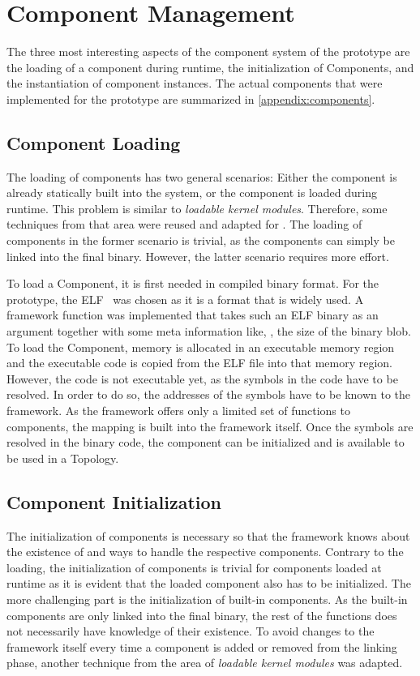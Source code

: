 \section{Component Management}%
\label{sec:impl:comp_management}

The three most interesting aspects of the component system of the prototype are the loading of a component during runtime, the initialization of Components, and the instantiation of component instances. The actual components that were implemented for the prototype are summarized in \cref{appendix:components}.

\subsection{Component Loading}

The loading of components has two general scenarios: Either the component is already statically built into the system, or the component is loaded during runtime. This problem is similar to \emph{loadable kernel modules}. Therefore, some techniques from that area were reused and adapted for \cobas{}. The loading of components in the former scenario is trivial, as the components can simply be linked into the final binary. However, the latter scenario requires more effort.

To load a Component, it is first needed in compiled binary format. For the prototype, the \ac{ELF}~\cite{SystemV,ELFSpec} was chosen as it is a format that is widely used. A framework function was implemented that takes such an \ac{ELF} binary as an argument together with some meta information like, \eg{}, the size of the binary blob. To load the Component, memory is allocated in an executable memory region and the executable code is copied from the \ac{ELF} file into that memory region. However, the code is not executable yet, as the symbols in the code have to be resolved. In order to do so, the addresses of the symbols have to be known to the \cobas{} framework. As the framework offers only a limited set of functions to components, the mapping is built into the framework itself. Once the symbols are resolved in the binary code, the component can be initialized and is available to be used in a Topology.

\subsection{Component Initialization}

The initialization of components is necessary so that the framework knows about the existence of and ways to handle the respective components. Contrary to the loading, the initialization of components is trivial for components loaded at runtime as it is evident that the loaded component also has to be initialized. The more challenging part is the initialization of built-in components. As the built-in components are only linked into the final binary, the rest of the \cobas{} functions does not necessarily have knowledge of their existence. To avoid changes to the \cobas{} framework itself every time a component is added or removed from the linking phase, another technique from the area of \emph{loadable kernel modules} was adapted.

